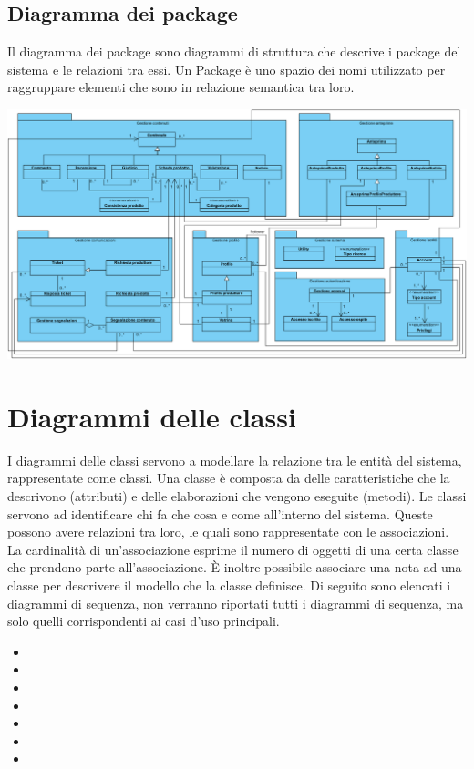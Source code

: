 \begin{landscape}
\section{Diagramma dei package}
Il diagramma dei package sono diagrammi di struttura che descrive i package del sistema e le relazioni tra essi.
Un Package è uno spazio dei nomi utilizzato per raggruppare elementi che sono in relazione semantica tra loro.
\begin{center}
			\includegraphics[width=\linewidth]{assets/visualParadigm/package/DiagrammaPacakage}
\end{center}
\end{landscape}

\section{Diagrammi delle classi}
I diagrammi delle classi servono a modellare la relazione tra le entità del sistema, rappresentate come classi.
Una classe è composta da delle caratteristiche che la descrivono (attributi) e delle elaborazioni che vengono eseguite (metodi). 
Le classi servono ad identificare chi fa che cosa e come all’interno del sistema. Queste possono avere relazioni tra loro, le quali sono rappresentate con le associazioni. La cardinalità di un’associazione esprime il numero di oggetti di una certa classe che prendono parte all’associazione.
È inoltre possibile associare una nota ad una classe per descrivere il modello che la classe definisce.
Di seguito sono elencati i diagrammi di sequenza, non verranno riportati tutti i diagrammi di sequenza, ma solo quelli corrispondenti ai casi d'uso principali.
\begin{itemize}
	\item {}
	\item {}
	\item {}
	\item {}
	\item {}
	\item {}
	\item {}
\end{itemize}


